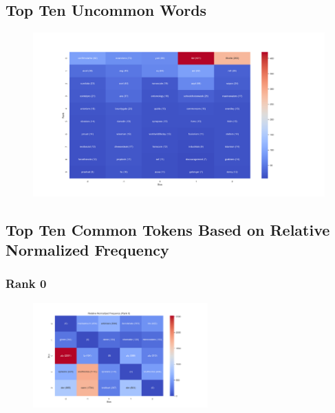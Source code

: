 \documentclass[11pt]{article}
\begin{document}
\pagebreak

\subsection{Top Ten Uncommon Words}
\begin{center}


\resizebox{\columnwidth}{!}
{
\TTUCTable
}
\begin{figure}[h!]
  \includegraphics[width=1.1\textwidth]{figs/top_ten_uc_words/word.png}
\end{figure}
\end{center}

\pagebreak

\subsection{Top Ten Common Tokens Based on Relative Normalized Frequency}
\subsubsection{Rank 0}
\begin{center}


\resizebox{\columnwidth}{!}
{
\TTRNFTable
}
\begin{figure}[h!]
  \includegraphics[width=0.6\textwidth]{figs/top_ten_rnf/rnf_t_rank_0.png}
\end{figure}
\end{center}
\end{document}
